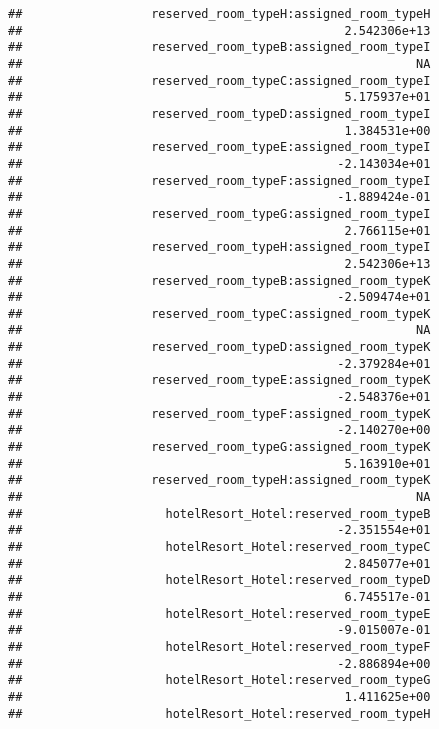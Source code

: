 \documentclass[
]{article}
\begin{document}
\begin{verbatim}
##                  reserved_room_typeH:assigned_room_typeH 
##                                             2.542306e+13 
##                  reserved_room_typeB:assigned_room_typeI 
##                                                       NA 
##                  reserved_room_typeC:assigned_room_typeI 
##                                             5.175937e+01 
##                  reserved_room_typeD:assigned_room_typeI 
##                                             1.384531e+00 
##                  reserved_room_typeE:assigned_room_typeI 
##                                            -2.143034e+01 
##                  reserved_room_typeF:assigned_room_typeI 
##                                            -1.889424e-01 
##                  reserved_room_typeG:assigned_room_typeI 
##                                             2.766115e+01 
##                  reserved_room_typeH:assigned_room_typeI 
##                                             2.542306e+13 
##                  reserved_room_typeB:assigned_room_typeK 
##                                            -2.509474e+01 
##                  reserved_room_typeC:assigned_room_typeK 
##                                                       NA 
##                  reserved_room_typeD:assigned_room_typeK 
##                                            -2.379284e+01 
##                  reserved_room_typeE:assigned_room_typeK 
##                                            -2.548376e+01 
##                  reserved_room_typeF:assigned_room_typeK 
##                                            -2.140270e+00 
##                  reserved_room_typeG:assigned_room_typeK 
##                                             5.163910e+01 
##                  reserved_room_typeH:assigned_room_typeK 
##                                                       NA 
##                    hotelResort_Hotel:reserved_room_typeB 
##                                            -2.351554e+01 
##                    hotelResort_Hotel:reserved_room_typeC 
##                                             2.845077e+01 
##                    hotelResort_Hotel:reserved_room_typeD 
##                                             6.745517e-01 
##                    hotelResort_Hotel:reserved_room_typeE 
##                                            -9.015007e-01 
##                    hotelResort_Hotel:reserved_room_typeF 
##                                            -2.886894e+00 
##                    hotelResort_Hotel:reserved_room_typeG 
##                                             1.411625e+00 
##                    hotelResort_Hotel:reserved_room_typeH 

\end{verbatim}
\end{document}
